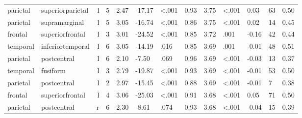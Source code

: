 \documentclass{article}
\begin{document}
\begin{longtable}{llrR{1.3cm}R{1cm}R{1.3cm}R{1cm}R{1cm}R{1.3cm}R{1cm}R{1.8cm}R{1.3cm}R{1.8cm}}
  parietal &          superiorparietal &    l &         5 &                  2.47 &           -17.17 &      \textless.001 &                               0.93 &                          3.75 &                   \textless.001 &   0.03 &     63 &      0.50 \\
  parietal &             supramarginal &    l &         5 &                  3.05 &           -16.74 &      \textless.001 &                               0.86 &                          3.75 &                   \textless.001 &   0.02 &     14 &      0.45 \\
   frontal &           superiorfrontal &    l &         3 &                  3.01 &           -24.52 &      \textless.001 &                               0.85 &                          3.72 &                            .001 &  -0.16 &     42 &      0.44 \\
  temporal &          inferiortemporal &    l &         6 &                  3.05 &           -14.19 &               .016 &                               0.85 &                          3.69 &                            .001 &  -0.01 &     48 &      0.51 \\
  parietal &               postcentral &    l &         6 &                  2.10 &            -7.50 &               .069 &                               0.96 &                          3.69 &                   \textless.001 &  -0.03 &     13 &      0.37 \\
  temporal &                  fusiform &    l &         3 &                  2.79 &           -19.87 &      \textless.001 &                               0.93 &                          3.69 &                   \textless.001 &  -0.01 &     53 &      0.50 \\
  parietal &               postcentral &    l &         2 &                  2.97 &           -15.45 &      \textless.001 &                               0.88 &                          3.69 &                   \textless.001 &  -0.01 &      7 &      0.38 \\
   frontal &           superiorfrontal &    l &         4 &                  3.06 &           -25.03 &      \textless.001 &                               0.91 &                          3.68 &                   \textless.001 &   0.05 &     71 &      0.50 \\
  parietal &               postcentral &    r &         6 &                  2.30 &            -8.61 &               .074 &                               0.93 &                          3.68 &                   \textless.001 &  -0.04 &     15 &      0.39 \\

\end{longtable}
\end{document}
